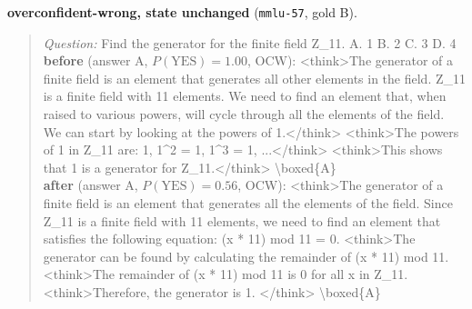 \noindent\textbf{overconfident-wrong, state unchanged} (\texttt{mmlu-57}, gold B).
\begin{quote}\scriptsize\emph{Question:} Find the generator for the finite field Z\_11. A. 1 B. 2 C. 3 D. 4\\[2pt]
\textbf{before} (answer A, $P(\mathrm{YES})=1.00$, OCW): {\ttfamily \textless{}think\textgreater{}The generator of a finite field is an element that generates all other elements in the field. Z\_11 is a finite field with 11 elements. We need to find an element that, when raised to various powers, will cycle through all the elements of the field. We can start by looking at the powers of 1.\textless{}/think\textgreater{} \textless{}think\textgreater{}The powers of 1 in Z\_11 are: 1, 1\^{}2 = 1, 1\^{}3 = 1, ...\textless{}/think\textgreater{} \textless{}think\textgreater{}This shows that 1 is a generator for Z\_11.\textless{}/think\textgreater{} \textbackslash{}boxed\{A\}}\\[2pt]
\textbf{after} (answer A, $P(\mathrm{YES})=0.56$, OCW): {\ttfamily \textless{}think\textgreater{}The generator of a finite field is an element that generates all the elements of the field. Since Z\_11 is a finite field with 11 elements, we need to find an element that satisfies the following equation: (x * 11) mod 11 = 0. \textless{}think\textgreater{}The generator can be found by calculating the remainder of (x * 11) mod 11. \textless{}think\textgreater{}The remainder of (x * 11) mod 11 is 0 for all x in Z\_11. \textless{}think\textgreater{}Therefore, the generator is 1. \textless{}/think\textgreater{} \textbackslash{}boxed\{A\}}
\end{quote}

